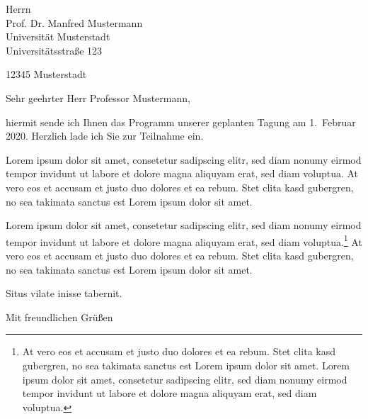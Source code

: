 \documentclass[foldmarks,rightdate,twoside,a4paper]{hhuletter}
\begin{document}
\fontsize{11}{13pt}\selectfont

\begin{letter}{Herrn\\
Prof. Dr. Manfred Mustermann\\
Universität Musterstadt\\
Universitätsstraße 123

12345 Musterstadt}







\signature{}


\subject{Einladung zur Mustertagung}



\opening{Sehr geehrter Herr Professor Mustermann,}

\raggedright %

hiermit sende ich Ihnen das Programm unserer geplanten Tagung am 1.~Februar
2020.  Herzlich lade ich Sie zur Teilnahme ein.

Lorem ipsum dolor sit amet, consetetur sadipscing elitr, sed diam nonumy
eirmod tempor invidunt ut labore et dolore magna aliquyam erat, sed diam
voluptua. At vero eos et accusam et justo duo dolores et ea rebum. Stet
clita kasd gubergren, no sea takimata sanctus est Lorem ipsum dolor sit
amet. 

Lorem ipsum dolor sit amet, consetetur sadipscing elitr, sed diam nonumy
eirmod tempor invidunt ut labore et dolore magna aliquyam erat, sed diam
voluptua.\footnote{At vero eos et accusam et justo duo dolores et ea rebum. Stet
clita kasd gubergren, no sea takimata sanctus est Lorem ipsum dolor sit
amet. Lorem ipsum dolor sit amet, consetetur sadipscing elitr, sed diam
nonumy eirmod tempor invidunt ut labore et dolore magna aliquyam erat, sed
diam voluptua.} At vero eos et accusam et justo duo dolores et ea rebum. Stet
clita kasd gubergren, no sea takimata sanctus est Lorem ipsum dolor sit
amet.   

Situs vilate inisse tabernit.


\closing{Mit freundlichen Grüßen}

\end{letter}
\end{document}
